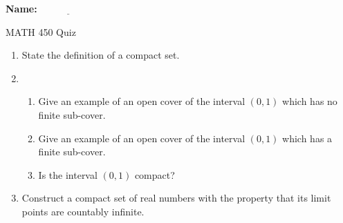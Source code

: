 \documentclass{article}[14pt]
\begin{document}
\begin{flushright}
{\bf Name:} $\underline{\ \ \ \ \ \ \ \ \ \ \ \ \ \ \ \ \ \ \ \ \ \ \ \ \ \ }$
\end{flushright}

\begin{center}
\large{MATH 450 Quiz}
\end{center}

\begin{enumerate}
\item State the definition of a compact set.
\vfill
\vfill

\item 
\begin{enumerate}                                                         %
  \item Give an example of an open cover of the interval \((0,1)\) which has no finite sub-cover. 
\vfill
  \item Give an example of an open cover of the interval \((0,1)\) which has a finite sub-cover. 
\vfill
  \item Is the interval \((0,1)\) compact? \vspace{20pt}
  \end{enumerate}

\item Construct a compact set of real numbers with the property that its limit points are countably infinite.

\vfill
\vfill
\vfill

\end{enumerate}
\end{document}
